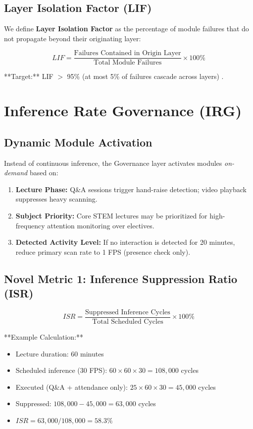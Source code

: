\documentclass[conference]{IEEEtran}
\begin{document}
\subsection{Layer Isolation Factor (LIF)}
We define \textbf{Layer Isolation Factor} as the percentage of module failures that do not propagate beyond their originating layer:

\begin{equation}
LIF = \frac{\text{Failures Contained in Origin Layer}}{\text{Total Module Failures}} \times 100\%
\end{equation}

**Target:** LIF $>$ 95\% (at most 5\% of failures cascade across layers) \cite{b18}.

\section{Inference Rate Governance (IRG)}

\subsection{Dynamic Module Activation}
Instead of continuous inference, the Governance layer activates modules \textit{on-demand} based on:
\begin{enumerate}
    \item \textbf{Lecture Phase:} Q\&A sessions trigger hand-raise detection; video playback suppresses heavy scanning.
    \item \textbf{Subject Priority:} Core STEM lectures may be prioritized for high-frequency attention monitoring over electives.
    \item \textbf{Detected Activity Level:} If no interaction is detected for 20 minutes, reduce primary scan rate to 1 FPS (presence check only).
\end{enumerate}

\subsection{Novel Metric 1: Inference Suppression Ratio (ISR)}
\begin{equation}
ISR = \frac{\text{Suppressed Inference Cycles}}{\text{Total Scheduled Cycles}} \times 100\%
\end{equation}

**Example Calculation:**
\begin{itemize}
    \item Lecture duration: 60 minutes
    \item Scheduled inference (30 FPS): $60 \times 60 \times 30 = 108,000$ cycles
    \item Executed (Q\&A + attendance only): $25 \times 60 \times 30 = 45,000$ cycles
    \item Suppressed: $108,000 - 45,000 = 63,000$ cycles
    \item $ISR = 63,000 / 108,000 = 58.3\%$
\end{itemize}
\end{document}
